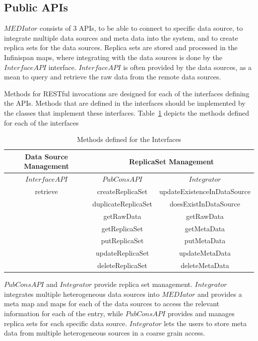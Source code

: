 \documentclass[conference]{IEEEtran}
\begin{document}
\subsection{Public APIs}
$MEDIator$ consists of 3 APIs, to be able to connect to specific data source, to integrate multiple data sources and meta data into the system, and to create replica sets for the data sources. Replica sets are stored and processed in the Infinispan maps, where integrating with the data sources is done by the $InterfaceAPI$ interface. $InterfaceAPI$ is often provided by the data sources, as a mean to query and retrieve the raw data from the remote data sources.

Methods for RESTful invocations are designed for each of the interfaces defining the APIs. Methods that are defined in the interfaces should be implemented by the classes that implement these interfaces. Table~\ref{table:interfaces} depicts the methods defined for each of the interfaces

\begin{table}[!ht]
\centering
\caption{Methods defined for the Interfaces \vspace{-13pt}}
\label{table:interfaces}
\begin{tabular}{|c||c| |c|}

\toprule
\textbf{Data Source Management} & \multicolumn{2}{c}{\textbf{ReplicaSet Management}} \\
\midrule

\textbf{$InterfaceAPI$} & \textbf{$PubConsAPI$}&\textbf{$Integrator$} \\
\hline
retrieve & createReplicaSet&updateExistenceInDataSource \\
  & duplicateReplicaSet&doesExistInDataSource\\
  & getRawData&getRawData\\
 & getReplicaSet&getMetaData \\
 & putReplicaSet&putMetaData \\
 & updateReplicaSet&updateMetaData \\
 & deleteReplicaSet&deleteMetaData \\
\bottomrule
\end{tabular}
 \vspace{-13pt}
\end{table}

$PubConsAPI$ and $Integrator$ provide replica set management. $Integrator$ integrates multiple heterogeneous data sources into $MEDIator$ and provides a meta map and maps for each of the data sources to access the relevant information for each of the entry, while $PubConsAPI$ provides and manages replica sets for each specific data source. $Integrator$ lets the users to store meta data from multiple heterogeneous sources in a coarse grain access. 
\end{document}
